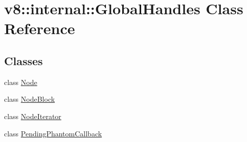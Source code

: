 \hypertarget{classv8_1_1internal_1_1GlobalHandles}{}\section{v8\+:\+:internal\+:\+:Global\+Handles Class Reference}
\label{classv8_1_1internal_1_1GlobalHandles}
\subsection*{Classes}
\begin{DoxyCompactItemize}
\item 
class \mbox{\hyperlink{classv8_1_1internal_1_1GlobalHandles_1_1Node}{Node}}
\item 
class \mbox{\hyperlink{classv8_1_1internal_1_1GlobalHandles_1_1NodeBlock}{Node\+Block}}
\item 
class \mbox{\hyperlink{classv8_1_1internal_1_1GlobalHandles_1_1NodeIterator}{Node\+Iterator}}
\item 
class \mbox{\hyperlink{classv8_1_1internal_1_1GlobalHandles_1_1PendingPhantomCallback}{Pending\+Phantom\+Callback}}
\end{DoxyCompactItemize}
